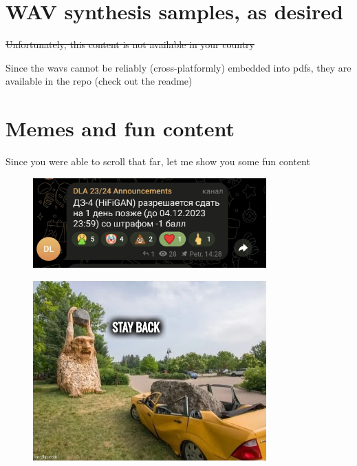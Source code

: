 \documentclass[a4paper]{article}
\begin{document}
\section{WAV synthesis samples, as desired}

\st{Unfortunately, this content is not available in your country}

Since the wavs cannot be reliably (cross-platformly) embedded into pdfs, they are available in the repo (check out the readme)


\clearpage

\section{Memes and fun content}

Since you were able to scroll that far, let me show you some fun content

\begin{figure}[htbp]
\centering
\includegraphics[width=0.8\textwidth]{meme-deadline-shift.jpg}

\label{fig:meme-deadline-shift}
\end{figure}

\begin{figure}[htbp]
\centering
\includegraphics[width=0.8\textwidth]{meme-stay-back.jpg}

\label{fig:meme-stay-back}
\end{figure}
\end{document}
